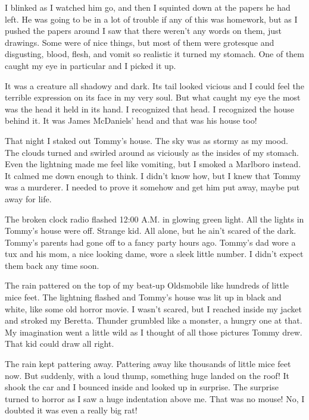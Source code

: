 I blinked as I watched him go, and then I squinted down at the
papers he had left. He was going to be in a lot of trouble if any
of this was homework, but as I pushed the papers around I saw that
there weren't any words on them, just drawings. Some were of
nice things, but most of them were grotesque and disgusting, blood,
flesh, and vomit so realistic it turned my stomach. One of them
caught my eye in particular and I picked it up.



It was a creature all shadowy and dark. Its tail looked vicious and
I could feel the terrible expression on its face in my very soul.
But what caught my eye the most was the head it held in its hand. I
recognized that head. I recognized the house behind it. It was
James McDaniels' head and that was his house too!



That night I staked out Tommy's house. The sky was as stormy
as my mood. The clouds turned and swirled around as viciously as
the insides of my stomach. Even the lightning made me feel like
vomiting, but I smoked a Marlboro instead. It calmed me down enough
to think. I didn't know how, but I knew that Tommy was a
murderer. I needed to prove it somehow and get him put away, maybe
put away for life.



The broken clock radio flashed 12:00 A.M. in glowing green light.
All the lights in Tommy's house were off. Strange kid. All
alone, but he ain't scared of the dark. Tommy's parents
had gone off to a fancy party hours ago. Tommy's dad wore a
tux and his mom, a nice looking dame, wore a sleek little number. I
didn't expect them back any time soon.



The rain pattered on the top of my beat-up Oldsmobile like hundreds
of little mice feet. The lightning flashed and Tommy's house
was lit up in black and white, like some old horror movie. I
wasn't scared, but I reached inside my jacket and stroked my
Beretta. Thunder grumbled like a monster, a hungry one at that. My
imagination went a little wild as I thought of all those pictures
Tommy drew. That kid could draw all right.



The rain kept pattering away. Pattering away like thousands of
little mice feet now. But suddenly, with a loud thump, something
huge landed on the roof! It shook the car and I bounced inside and
looked up in surprise. The surprise turned to horror as I saw a
huge indentation above me. That was no mouse! No, I doubted it was
even a really big rat!



